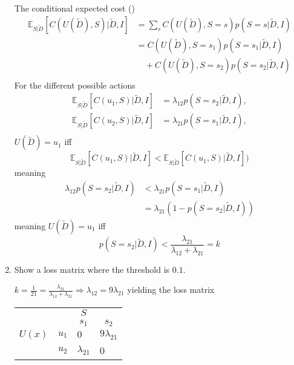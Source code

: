 \begin{example}
\begin{enumerate}
		The conditional expected cost ()
		\begin{equation}
			\begin{split}
				\mathbb{E}_{S|\tilde{D}}[C(U(\tilde{D}), S)|\tilde{D},I] & = \sum_sC(U(\tilde{D}),S=s)p(S=s|\tilde{D},I)\\
				& = C(U(\tilde{D}),S=s_1)p(S=s_1|\tilde{D},I)\\
				& \quad+C(U(\tilde{D}),S=s_2)p(S=s_2|\tilde{D},I)\\
			\end{split}
		\end{equation}
		For the different possible actions
		\begin{equation}
			\begin{split}
				\mathbb{E}_{S|\tilde{D}}[C(u_1, S)|\tilde{D},I] &= \lambda_{12}p(S=s_2|\tilde{D},I),\\
				\mathbb{E}_{S|\tilde{D}}[C(u_2, S)|\tilde{D},I] &= \lambda_{21}p(S=s_1|\tilde{D},I),\\
			\end{split}
		\end{equation}
		$U(\tilde{D})=u_1$ iff
		\begin{equation}
			\mathbb{E}_{S|\tilde{D}}[C(u_1,S)|\tilde{D},I]<\mathbb{E}_{S|\tilde{D}}[C(u_1,S)|\tilde{D},I])
		\end{equation}
		meaning
		\begin{equation}
			\begin{split}
				\lambda_{12}p(S=s_2|\tilde{D},I)&<\lambda_{21}p(S = s_1|\tilde{D},I)\\
				&=\lambda_{21}(1-p(S =s_2|\tilde{D},I))
			\end{split}
		\end{equation}
		meaning $U(\tilde{D}) = u_1$ iff
		\begin{equation}
			p(S=s_2|\tilde{D},I)<\frac{\lambda_{21}}{\lambda_{12}+\lambda_{21}}=k
		\end{equation}
		
		
		\item Show a loss matrix where the threshold is $0.1$.\newline
		
		$k = \frac{1}{21}=\frac{\lambda_{21}}{\lambda_{12}+\lambda_{21}} \Rightarrow \lambda_{12}=9\lambda_{21}$ yielding the loss matrix
		
		\begin{center}
			\begin{tabular}{ c  c  c  c }
				&& $S$& \\
				&& $s_1$ & $s_2$  \\
				\cline{3-4}
				$U(x)$ & $u_1$& \multicolumn{1}{|l}{$0$} &\multicolumn{1}{l|}{$9\lambda_{21}$}  \\
				& $u_2$& \multicolumn{1}{|l}{$\lambda_{21}$} & \multicolumn{1}{l|}{0} \\
				\cline{3-4}
			\end{tabular}
		\end{center}
		

\end{enumerate}
\end{example}
